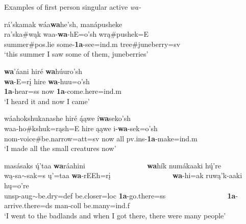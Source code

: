 \begin{exe}

\item\label{1Aexamples} Examples of first person singular active \textit{wa-}

	\begin{xlist}
	
	\item \glll rá'skamak wáa\textbf{wa}he'sh, manápusheke\\
	ra'ska\#wąk waa-\textbf{wa}-hE=o'sh wrą\#pushek=E\\
	\textnormal{summer}\#pos.lie \textnormal{some}-\textbf{1a}-\textnormal{see}=ind.m \textnormal{tree}\#\textnormal{juneberry}=sv\\
	\glt `this summer I saw some of them, juneberries' \citep[52]{hollow1973a}

	\item \glll \textbf{wa}'áani hiré \textbf{wa}húuro'sh\\
	\textbf{wa}-E=rį hire \textbf{wa}-huu=o'sh\\
	\textbf{1a}-\textnormal{hear}=ss \textnormal{now} \textbf{1a}-\textnormal{come.here}=ind.m\\
	\glt `I heard it and now I came' \citep[41]{hollow1973a}
	
	\item \glll wáahokshukanashe hiré ą́ąwe í\textbf{wa}seko'sh\\
	waa-ho\#kshuk=rąsh=E hire ąąwe i-\textbf{wa}-sek=o'sh\\
	nom-\textnormal{voice}\#\textnormal{be.narrow}=att=sv \textnormal{now} \textnormal{all} pv.ins-\textbf{1a}-\textnormal{make}=ind.m\\
	\glt `I made all the small creatures now' \citep[11]{hollow1973a}
	
	\item \glll masásaks ų́'taa \textbf{wa}ráahini ~ ~ ~ ~ ~ ~ ~ ~ ~ ~ \textbf{wa}hík numákaaki hų́'re\\
	wą-sa$\sim$sak=s ų'=taa \textbf{wa}-rEEh=rį ~ ~ ~ ~ ~ ~ ~ ~ ~ ~ \textbf{wa}-hi=ak ruwą'k-aaki hų=o're\\
	unsp-aug$\sim$\textnormal{be.dry}=def \textnormal{be.closer}=loc \textbf{1a}-\textnormal{go.there}=ss ~ ~ ~ ~ ~ ~ ~ ~ ~ ~ \textbf{1a}-\textnormal{arrive.there}=ds \textnormal{man}-coll \textnormal{be.many}=ind.f\\
	\glt `I went to the badlands and when I got there, there were many people' \citep[318]{hollow1973b}
	

\end{xlist}
\end{exe}
